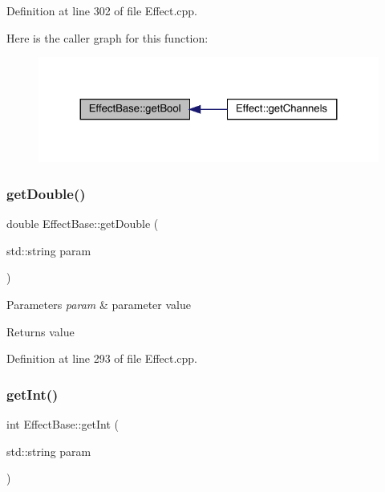 Definition at line 302 of file Effect.\+cpp.

Here is the caller graph for this function\+:
\nopagebreak
\begin{figure}[H]
\begin{center}
\leavevmode
\includegraphics[width=324pt]{class_effect_base_a5ce32d92ebf6973d177d0f8d1be8e8ba_icgraph}
\end{center}
\end{figure}
\mbox{\label{class_effect_base_a29ac04c6135b4a202c0fab169f97f436}} 
\subsubsection{\texorpdfstring{get\+Double()}{getDouble()}}
{\footnotesize\ttfamily double Effect\+Base\+::get\+Double (\begin{DoxyParamCaption}\item[{std\+::string}]{param }\end{DoxyParamCaption})\hspace{0.3cm}{\ttfamily [static]}}


\begin{DoxyParams}{Parameters}
{\em param} & parameter value \\
\hline
\end{DoxyParams}
\begin{DoxyReturn}{Returns}
value 
\end{DoxyReturn}


Definition at line 293 of file Effect.\+cpp.

\mbox{\label{class_effect_base_aa2c8a7dfd4511cbb41f5ca1afd14cbb5}} 
\subsubsection{\texorpdfstring{get\+Int()}{getInt()}}
{\footnotesize\ttfamily int Effect\+Base\+::get\+Int (\begin{DoxyParamCaption}\item[{std\+::string}]{param }\end{DoxyParamCaption})\hspace{0.3cm}{\ttfamily [static]}}


